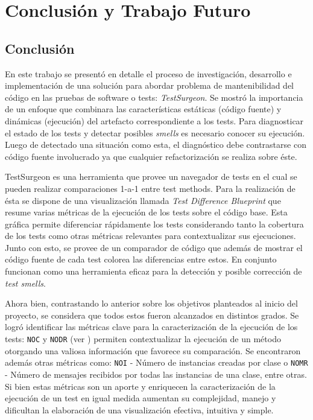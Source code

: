 \chapter{Conclusión y Trabajo Futuro}

\section{Conclusión}

\par En este trabajo se presentó en detalle el proceso de investigación, desarrollo e implementación de una solución para abordar problema de mantenibilidad del código en las pruebas de software o tests: \emph{TestSurgeon}. Se mostró la importancia de un enfoque que combinara las características estáticas (código fuente) y dinámicas (ejecución) del artefacto correspondiente a los tests. Para diagnosticar el estado de los tests y detectar posibles \emph{smells} es necesario conocer su ejecución. Luego de detectado una situación como esta, el diagnóstico debe contrastarse con código fuente involucrado ya que cualquier refactorización se realiza sobre éste.

\par TestSurgeon es una herramienta que provee un navegador de tests en el cual se pueden realizar comparaciones 1-a-1 entre test methods. Para la realización de ésta se dispone de una visualización llamada \emph{Test Difference Blueprint} que resume varias métricas de la ejecución de los tests sobre el código base. Esta gráfica permite diferenciar rápidamente los tests considerando tanto la cobertura de los tests como otras métricas relevantes para contextualizar sus ejecuciones. Junto con esto, se provee de un comparador de código que además de mostrar el código fuente de cada test colorea las diferencias entre estos. En conjunto funcionan como una herramienta eficaz para la detección y posible corrección de \emph{test smells}.


\par Ahora bien, contrastando lo anterior sobre los objetivos planteados al inicio del proyecto, se considera que todos estos fueron alcanzados en distintos grados. Se logró identificar las métricas clave para la caracterización de la ejecución de los tests: {\tt NOC} y {\tt NODR} (ver ) permiten contextualizar la ejecución de un método otorgando una valiosa información que favorece su comparación. Se encontraron además otras métricas como: {\tt NOI} - Número de instancias creadas por clase o {\tt NOMR} - Número de mensajes recibidos por todas las instancias de una clase, entre otras. Si bien estas métricas son un aporte y enriquecen la caracterización de la ejecución de un test en igual medida aumentan su complejidad, manejo y dificultan la elaboración de una visualización efectiva, intuitiva y simple. 

